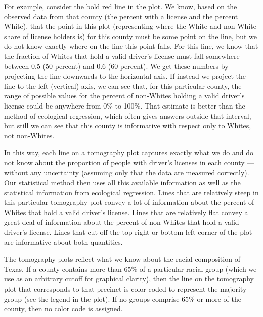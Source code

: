 \documentclass[12pt]{article}
\begin{document}
For example, consider the bold red line in the plot. We know, based
on the observed data from that county (the percent with a license and the
percent White), that the point in this plot (representing where the
White and non-White share of license holders is) for this county must be some
point on the line, but we do not know exactly where on the line this
point falls. For this line, we know that the fraction of Whites that
hold a valid driver's license must fall somewhere between 0.5 (50
percent) and 0.6 (60 percent). We get these numbers by projecting the
line downwards to the horizontal axis. If instead we project the line
to the left (vertical) axis, we can see that, for this particular
county, the range of possible values for the percent of non-Whites
holding a valid driver's license could be anywhere from 0\% to 100\%.
That estimate is better than the method of ecological regression,
which often gives answers outside that interval, but still we can see
that this county is informative with respect only to Whites, not
non-Whites. 

In this way, each line on a tomography plot captures exactly what we
do and do not know about the proportion of people with driver's licenses in each county ---
without any uncertainty (assuming only that the data are measured
correctly). Our statistical method then uses all this available
information as well as the statistical information from ecological
regression. Lines that are relatively steep in this particular
tomography plot convey a lot of information about the percent of
Whites that hold a valid driver's license.  Lines that are
relatively flat convey a great deal of information about the percent
of non-Whites that hold a valid driver's license.  Lines that cut off
the top right or bottom left corner of the plot are informative about
both quantities.

The tomography plots reflect what we know about the racial composition
of Texas. If a county contains more than 65\% of a
particular racial group (which we use as an arbitrary cutoff for
graphical clarity), then the line on the tomography plot that
corresponds to that precinct is color coded to represent the majority
group (see the legend in the plot). If no groups comprise 65\% or more
of the county, then no color code is assigned.  
\end{document}
